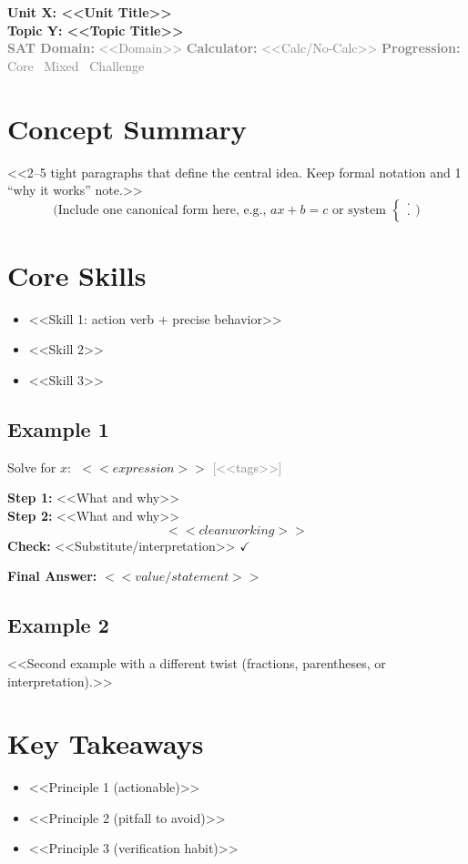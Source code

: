 \documentclass[14pt]{extarticle}
\newcommand{\UnitTitle}{Unit X: <<Unit Title>>}
\newcommand{\TopicTitle}{Topic Y: <<Topic Title>>}
\newcommand{\TopicMeta}[3]{%
  \textcolor{gray}{\footnotesize \textbf{SAT Domain:} #1 \quad \textbf{Calculator:} #2 \quad \textbf{Progression:} #3}
}
\newcommand{\qtag}[1]{\textcolor{gray}{\footnotesize [#1]}}
\newenvironment{Example}[1]{%
  \subsection*{Example #1}%
}{\vspace{0.25em}}
\begin{document}
\raggedright
{}

\begin{center}
  \LARGE \textbf{\UnitTitle}\\[6pt]
  \Large \textbf{\TopicTitle}\\[4pt]
  \TopicMeta{<<Domain>>}{<<Calc/No-Calc>>}{Core \textrightarrow\ Mixed \textrightarrow\ Challenge}
\end{center}

\vspace{0.75em}

\section*{Concept Summary}
<<2–5 tight paragraphs that define the central idea. Keep formal notation and 1 “why it works” note.>>
\[
\text{(Include one canonical form here, e.g., } ax+b=c \text{ or system } \begin{cases} \cdot \\ \cdot \end{cases})
\]

\section*{Core Skills}
\begin{itemize}
  \item <<Skill 1: action verb + precise behavior>>
  \item <<Skill 2>>
  \item <<Skill 3>>
\end{itemize}

\begin{Example}{1}
Solve for \(x\): \(\;<<expression>>\) \qtag{<<tags>>}

\textbf{Step 1:} <<What and why>> \\
\textbf{Step 2:} <<What and why>>
\[
<<clean working>>
\]
\textbf{Check:} <<Substitute/interpretation>> \quad \(\checkmark\)

\textbf{Final Answer:} \(\boxed{<<value/statement>>}\)
\end{Example}

\begin{Example}{2}
<<Second example with a different twist (fractions, parentheses, or interpretation).>>
\end{Example}

\section*{Key Takeaways}
\begin{itemize}
  \item <<Principle 1 (actionable)>>
  \item <<Principle 2 (pitfall to avoid)>>
  \item <<Principle 3 (verification habit)>>
\end{itemize}
\end{document}

